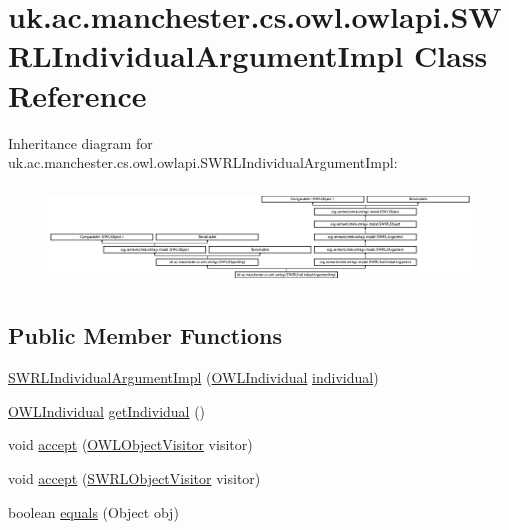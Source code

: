 \hypertarget{classuk_1_1ac_1_1manchester_1_1cs_1_1owl_1_1owlapi_1_1_s_w_r_l_individual_argument_impl}{\section{uk.\-ac.\-manchester.\-cs.\-owl.\-owlapi.\-S\-W\-R\-L\-Individual\-Argument\-Impl Class Reference}
\label{classuk_1_1ac_1_1manchester_1_1cs_1_1owl_1_1owlapi_1_1_s_w_r_l_individual_argument_impl}
}
Inheritance diagram for uk.\-ac.\-manchester.\-cs.\-owl.\-owlapi.\-S\-W\-R\-L\-Individual\-Argument\-Impl\-:\begin{figure}[H]
\begin{center}
\leavevmode
\includegraphics[height=2.663043cm]{classuk_1_1ac_1_1manchester_1_1cs_1_1owl_1_1owlapi_1_1_s_w_r_l_individual_argument_impl}
\end{center}
\end{figure}
\subsection*{Public Member Functions}
\begin{DoxyCompactItemize}
\item 
\hyperlink{classuk_1_1ac_1_1manchester_1_1cs_1_1owl_1_1owlapi_1_1_s_w_r_l_individual_argument_impl_a518458254e8529f41c4d8bdaa7a22744}{S\-W\-R\-L\-Individual\-Argument\-Impl} (\hyperlink{interfaceorg_1_1semanticweb_1_1owlapi_1_1model_1_1_o_w_l_individual}{O\-W\-L\-Individual} \hyperlink{classuk_1_1ac_1_1manchester_1_1cs_1_1owl_1_1owlapi_1_1_s_w_r_l_individual_argument_impl_aa1f847148e8de013c222004724cbe622}{individual})
\item 
\hyperlink{interfaceorg_1_1semanticweb_1_1owlapi_1_1model_1_1_o_w_l_individual}{O\-W\-L\-Individual} \hyperlink{classuk_1_1ac_1_1manchester_1_1cs_1_1owl_1_1owlapi_1_1_s_w_r_l_individual_argument_impl_aca03b0b770b44307ef55a2edd6d2cc0e}{get\-Individual} ()
\item 
void \hyperlink{classuk_1_1ac_1_1manchester_1_1cs_1_1owl_1_1owlapi_1_1_s_w_r_l_individual_argument_impl_a361dcea08cf8e3112d7a0667dd72414e}{accept} (\hyperlink{interfaceorg_1_1semanticweb_1_1owlapi_1_1model_1_1_o_w_l_object_visitor}{O\-W\-L\-Object\-Visitor} visitor)
\item 
void \hyperlink{classuk_1_1ac_1_1manchester_1_1cs_1_1owl_1_1owlapi_1_1_s_w_r_l_individual_argument_impl_a42324f25c91f913139508b61369d3998}{accept} (\hyperlink{interfaceorg_1_1semanticweb_1_1owlapi_1_1model_1_1_s_w_r_l_object_visitor}{S\-W\-R\-L\-Object\-Visitor} visitor)
\item 
boolean \hyperlink{classuk_1_1ac_1_1manchester_1_1cs_1_1owl_1_1owlapi_1_1_s_w_r_l_individual_argument_impl_af472306024ef2083015d1ed985efcb17}{equals} (Object obj)
\end{DoxyCompactItemize}
